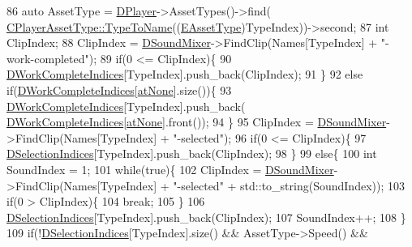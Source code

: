 \begin{DoxyCode}
86         \textcolor{keyword}{auto} AssetType = \hyperlink{classCSoundEventRenderer_ad98889d7f52477a2e148d7e390641d51}{DPlayer}->AssetTypes()->find(
      \hyperlink{classCPlayerAssetType_a66ce89c35b74940e9fc947a1f4b9e770}{CPlayerAssetType::TypeToName}((\hyperlink{GameDataTypes_8h_a5600d4fc433b83300308921974477fec}{EAssetType})TypeIndex))->second;
87         \textcolor{keywordtype}{int} ClipIndex;
88         ClipIndex = \hyperlink{classCSoundEventRenderer_a5abf598a7e8783d9cc78e0d33a65c9c2}{DSoundMixer}->FindClip(Names[TypeIndex] + \textcolor{stringliteral}{"-work-completed"});
89         \textcolor{keywordflow}{if}(0 <= ClipIndex)\{
90             \hyperlink{classCSoundEventRenderer_a59a26b4062659921cfb24d7f76253938}{DWorkCompleteIndices}[TypeIndex].push\_back(ClipIndex);
91         \}
92         \textcolor{keywordflow}{else} \textcolor{keywordflow}{if}(\hyperlink{classCSoundEventRenderer_a59a26b4062659921cfb24d7f76253938}{DWorkCompleteIndices}[\hyperlink{GameDataTypes_8h_a5600d4fc433b83300308921974477feca82fb51718e2c00981a2d37bc6fe92593}{atNone}].size())\{
93             \hyperlink{classCSoundEventRenderer_a59a26b4062659921cfb24d7f76253938}{DWorkCompleteIndices}[TypeIndex].push\_back(
      \hyperlink{classCSoundEventRenderer_a59a26b4062659921cfb24d7f76253938}{DWorkCompleteIndices}[\hyperlink{GameDataTypes_8h_a5600d4fc433b83300308921974477feca82fb51718e2c00981a2d37bc6fe92593}{atNone}].front());
94         \}
95         ClipIndex = \hyperlink{classCSoundEventRenderer_a5abf598a7e8783d9cc78e0d33a65c9c2}{DSoundMixer}->FindClip(Names[TypeIndex] + \textcolor{stringliteral}{"-selected"});
96         \textcolor{keywordflow}{if}(0 <= ClipIndex)\{
97             \hyperlink{classCSoundEventRenderer_afda3dfc8fa16264d91bc56a4bb1d150c}{DSelectionIndices}[TypeIndex].push\_back(ClipIndex);
98         \}
99         \textcolor{keywordflow}{else}\{
100             \textcolor{keywordtype}{int} SoundIndex = 1;
101             \textcolor{keywordflow}{while}(\textcolor{keyword}{true})\{
102                 ClipIndex = \hyperlink{classCSoundEventRenderer_a5abf598a7e8783d9cc78e0d33a65c9c2}{DSoundMixer}->FindClip(Names[TypeIndex] + \textcolor{stringliteral}{"-selected"} + 
      std::to\_string(SoundIndex));
103                 \textcolor{keywordflow}{if}(0 > ClipIndex)\{
104                     \textcolor{keywordflow}{break};   
105                 \}
106                 \hyperlink{classCSoundEventRenderer_afda3dfc8fa16264d91bc56a4bb1d150c}{DSelectionIndices}[TypeIndex].push\_back(ClipIndex);
107                 SoundIndex++;
108             \}
109             \textcolor{keywordflow}{if}(!\hyperlink{classCSoundEventRenderer_afda3dfc8fa16264d91bc56a4bb1d150c}{DSelectionIndices}[TypeIndex].size() && AssetType->Speed() && 

\end{DoxyCode}
